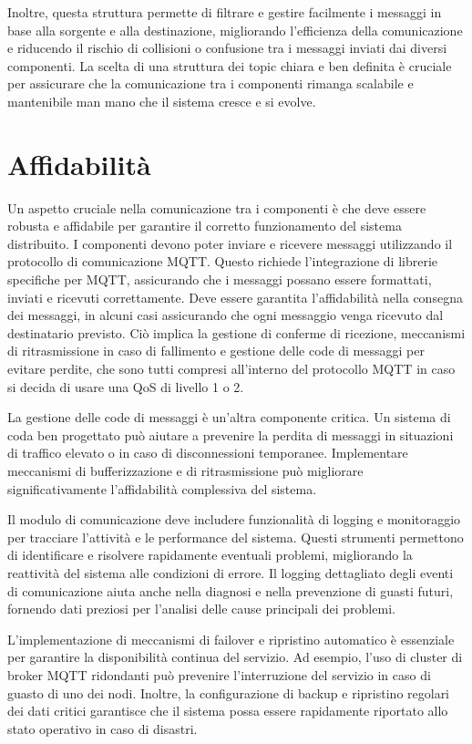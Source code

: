 \documentclass[12pt,a4paper,openright,twoside]{book}
\begin{document}
Inoltre, questa struttura permette di filtrare e gestire facilmente i messaggi in base alla sorgente e alla destinazione, migliorando l'efficienza della comunicazione e riducendo 
il rischio di collisioni o confusione tra i messaggi inviati dai diversi componenti. La scelta di una struttura dei topic chiara e ben definita è cruciale per assicurare che la 
comunicazione tra i componenti rimanga scalabile e mantenibile man mano che il sistema cresce e si evolve.

\section{Affidabilità}
Un aspetto cruciale nella comunicazione tra i componenti è che deve essere robusta e affidabile per garantire il corretto funzionamento del sistema distribuito. I componenti 
devono poter inviare e ricevere messaggi utilizzando il protocollo di comunicazione \ac{MQTT}. Questo richiede l'integrazione di librerie specifiche per \ac{MQTT}, assicurando 
che i messaggi possano essere formattati, inviati e ricevuti correttamente. Deve essere garantita l'affidabilità nella consegna dei messaggi, in alcuni casi assicurando che ogni 
messaggio venga ricevuto dal destinatario previsto. Ciò implica la gestione di conferme di ricezione, meccanismi di ritrasmissione in caso di fallimento e 
gestione delle code di messaggi per evitare perdite, che sono tutti compresi all'interno del protocollo \ac{MQTT} in caso si decida di usare una \ac{QoS} di livello 1 o 2.

La gestione delle code di messaggi è un'altra componente critica. Un sistema di coda ben progettato può aiutare a prevenire la perdita di messaggi in situazioni di traffico elevato 
o in caso di disconnessioni temporanee. Implementare meccanismi di bufferizzazione e di ritrasmissione può migliorare significativamente l'affidabilità complessiva del sistema.

Il modulo di comunicazione deve includere funzionalità di logging e monitoraggio per tracciare l'attività e le performance del sistema. Questi strumenti permettono di identificare 
e risolvere rapidamente eventuali problemi, migliorando la reattività del sistema alle condizioni di errore. Il logging dettagliato degli eventi di comunicazione aiuta anche nella 
diagnosi e nella prevenzione di guasti futuri, fornendo dati preziosi per l'analisi delle cause principali dei problemi.

L'implementazione di meccanismi di failover e ripristino automatico è essenziale per garantire la disponibilità continua del servizio. Ad esempio, l'uso di cluster di broker MQTT 
ridondanti può prevenire l'interruzione del servizio in caso di guasto di uno dei nodi. Inoltre, la configurazione di backup e ripristino regolari dei dati critici garantisce che 
il sistema possa essere rapidamente riportato allo stato operativo in caso di disastri.
\end{document}
